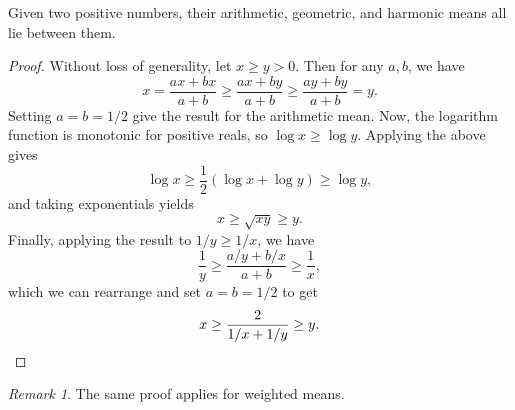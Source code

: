\documentclass[11pt]{article}
\theoremstyle{definition}
\theoremstyle{remark}
\newtheorem*{remark}{Remark}
\numberwithin{equation}{section}
\begin{document}
    \begin{exercise}
        Given two positive numbers, their arithmetic, geometric, and harmonic means
        all lie between them.
    \end{exercise}
    \begin{proof}
        Without loss of generality, let $x \geq y > 0$. Then for any $a, b$, we have
        \[
            x = \frac{ax + bx}{a + b} \geq \frac{ax + by}{a + b} \geq \frac{ay +
            by}{a + b} = y.
        \] Setting $a = b = 1 / 2$ give the result for the arithmetic mean. Now, the
        logarithm function is monotonic for positive reals, so $\log{x} \geq
        \log{y}$. Applying the above gives \[
            \log{x} \geq \frac{1}{2}(\log{x} + \log{y}) \geq \log{y},
        \] and taking exponentials yields \[
            x \geq \sqrt{xy} \geq y.
        \] Finally, applying the result to $1 / y \geq 1 / x$, we have \[
            \frac{1}{y} \geq \frac{a / y + b / x}{a + b} \geq \frac{1}{x},
        \] which we can rearrange and set $a = b = 1 / 2$ to get \[
            x \geq \frac{2}{1 / x + 1 / y} \geq y. \qedhere
        \] 
    \end{proof}
    \begin{remark}
        The same proof applies for weighted means.
    \end{remark}
\end{document}
